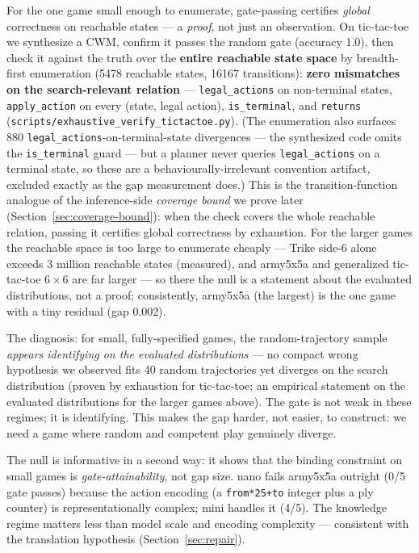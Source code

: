 \documentclass[11pt]{article}
\theoremstyle{remark}
\begin{document}
For the one game small enough to enumerate, gate-passing certifies \emph{global} correctness on reachable states --- a \emph{proof}, not just an observation. On tic-tac-toe we synthesize a CWM, confirm it passes the random gate (accuracy 1.0), then check it against the truth over the \textbf{entire reachable state space} by breadth-first enumeration (5478 reachable states, 16167 transitions): \textbf{zero mismatches on the search-relevant relation} --- \texttt{legal\_actions} on non-terminal states, \texttt{apply\_action} on every (state, legal action), \texttt{is\_terminal}, and \texttt{returns} (\texttt{scripts/exhaustive\_verify\_tictactoe.py}). (The enumeration also surfaces 880 \texttt{legal\_actions}-on-terminal-state divergences --- the synthesized code omits the \texttt{is\_terminal} guard --- but a planner never queries \texttt{legal\_actions} on a terminal state, so these are a behaviourally-irrelevant convention artifact, excluded exactly as the gap measurement does.) This is the transition-function analogue of the inference-side \emph{coverage bound} we prove later (Section~\ref{sec:coverage-bound}): when the check covers the whole reachable relation, passing it certifies global correctness by exhaustion. For the larger games the reachable space is too large to enumerate cheaply --- Trike side-6 alone exceeds 3 million reachable states (measured), and army5x5a and generalized tic-tac-toe $6\times6$ are far larger --- so there the null is a statement about the evaluated distributions, not a proof; consistently, army5x5a (the largest) is the one game with a tiny residual (gap 0.002).

The diagnosis: for small, fully-specified games, the random-trajectory sample \emph{appears identifying on the evaluated distributions} --- no compact wrong hypothesis we observed fits 40 random trajectories yet diverges on the search distribution (proven by exhaustion for tic-tac-toe; an empirical statement on the evaluated distributions for the larger games above). The gate is not weak in these regimes; it is identifying. This makes the gap harder, not easier, to construct: we need a game where random and competent play genuinely diverge.

The null is informative in a second way: it shows that the binding constraint on small games is \emph{gate-attainability}, not gap size. nano fails army5x5a outright (0/5 gate passes) because the action encoding (a \texttt{from*25+to} integer plus a ply counter) is representationally complex; mini handles it (4/5). The knowledge regime matters less than model scale and encoding complexity --- consistent with the translation hypothesis (Section~\ref{sec:repair}).
\end{document}
